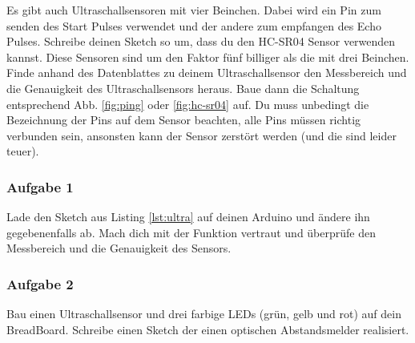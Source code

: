 
Es gibt auch Ultraschallsensoren mit vier Beinchen. Dabei wird ein Pin zum senden des Start Pulses verwendet und der andere zum empfangen des Echo Pulses. Schreibe deinen Sketch so um, dass du den HC-SR04 Sensor verwenden kannst. Diese Sensoren sind um den Faktor fünf billiger als die mit drei Beinchen.
Finde anhand des Datenblattes zu deinem Ultraschallsensor den Messbereich und die Genauigkeit des Ultraschallsensors heraus. Baue dann die Schaltung entsprechend Abb. \ref{fig:ping} oder \ref{fig:hc-sr04} auf. Du muss unbedingt die Bezeichnung der Pins auf dem Sensor beachten, alle  Pins müssen richtig verbunden sein, ansonsten kann der Sensor zerstört werden (und die sind leider teuer).

\subsubsection{Aufgabe 1}
Lade den Sketch aus Listing \ref{lst:ultra} auf deinen Arduino und ändere ihn gegebenenfalls ab. Mach dich mit der Funktion vertraut und überprüfe den Messbereich und die Genauigkeit des Sensors. 


                          
\subsubsection{Aufgabe 2}
Bau einen Ultraschallsensor und drei farbige LEDs (grün, gelb und rot) auf dein BreadBoard. Schreibe einen Sketch der einen optischen Abstandsmelder realisiert.


